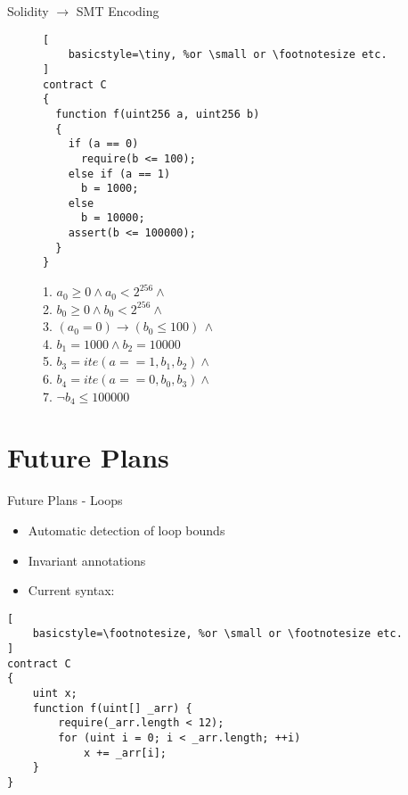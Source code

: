 \documentclass{beamer}
\begin{document}
\begin{frame}[fragile]{Solidity $\rightarrow$ SMT Encoding}
\begin{figure}
\noindent\begin{minipage}{.48\textwidth}
\begin{lstlisting}[
    basicstyle=\tiny, %or \small or \footnotesize etc.
]
contract C
{
  function f(uint256 a, uint256 b)
  {
    if (a == 0)
      require(b <= 100);
    else if (a == 1)
      b = 1000;
    else
      b = 10000;
    assert(b <= 100000);
  }
}
\end{lstlisting}
\end{minipage}\hfill
\begin{minipage}{.48\textwidth}
1. $a_0 \ge 0 \land a_0 < 2^{256}  \land \phantom{x}$\\
2. $b_0 \ge 0 \land b_0 < 2^{256}  \land \phantom{x}$\\
3. $(a_0 = 0) \rightarrow (b_0 \le 100) \, \land$\\
4. $b_1 = 1000 \land b_2 = 10000$\\
5. $b_3 = ite(a == 1, b_1, b_2) \land \phantom{x}$\\
6. $b_4 = ite(a == 0, b_0, b_3) \land \phantom{x}$\\
7. $\neg b_4 \le 100000$
\end{minipage}
\end{figure}

\end{frame}

\section{Future Plans}

\begin{frame}[fragile]{Future Plans - Loops}
\begin{itemize}
	\item Automatic detection of loop bounds \bigskip
	\item Invariant annotations \bigskip
	\item Current syntax:
\end{itemize}
\begin{lstlisting}[
    basicstyle=\footnotesize, %or \small or \footnotesize etc.
]
contract C
{
    uint x;
    function f(uint[] _arr) {
        require(_arr.length < 12);
        for (uint i = 0; i < _arr.length; ++i)
            x += _arr[i];
    }
}
\end{lstlisting}
\end{frame}
\end{document}
